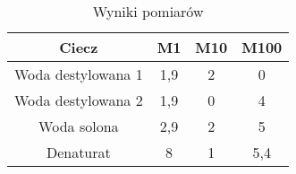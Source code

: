 \documentclass{article} %
\begin{document}
\begin{table}[h!]
\centering
\begin{tabular}{|c|c|c|c|}
\hline
\textbf{Ciecz} & \textbf{M1} & \textbf{M10} & \textbf{M100} \\
\hline
Woda destylowana 1 & 1,9 & 2 & 0 \\
Woda destylowana 2 & 1,9 & 0 & 4 \\
Woda solona & 2,9 & 2 & 5 \\
Denaturat & 8 & 1 & 5,4 \\
\hline
\end{tabular}
\caption{Wyniki pomiarów}
\label{table:students}
\end{table}
\end{document}
